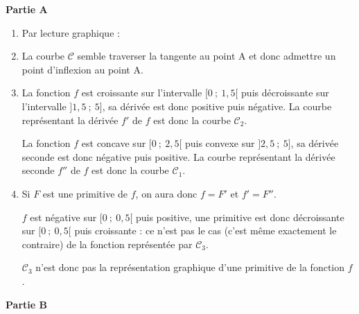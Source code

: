 \medskip

\textbf{Partie A}


\begin{enumerate}
	\item  Par lecture graphique :

	\begin{center}
	\end{center}



	\item La courbe $\mathcal{C}$  semble traverser la tangente au point A et donc  admettre un point d'inflexion au point A.

	\item La fonction $f$ est croissante sur l'intervalle $[0~;~1,5[$ puis décroissante sur l'intervalle $]1,5~;~5]$, sa dérivée est donc positive puis négative. La courbe représentant la dérivée $f'$ de $f$ est donc la courbe $\mathcal{C}_2$.

	La fonction $f$ est concave sur $[0~;~2,5[$ puis convexe sur $]2,5~;~5]$, sa dérivée seconde est donc négative puis positive. La courbe représentant la dérivée seconde $f''$ de $f$ est donc la courbe $\mathcal{C}_1$.

	\item Si $F$  est une primitive de $f$, on aura donc $f = F'$ et $f'= F''$.

$f$ est négative sur $[0~;~0,5[$ puis positive, une primitive est donc décroissante sur $[0~;~0,5[$ puis croissante : ce n'est pas le cas (c'est même exactement le contraire) de la fonction représentée par $\mathcal{C}_3$.

$\mathcal{C}_3$ n'est donc pas la représentation graphique d'une primitive de la fonction $f$.




\end{enumerate}

\textbf{Partie B}


